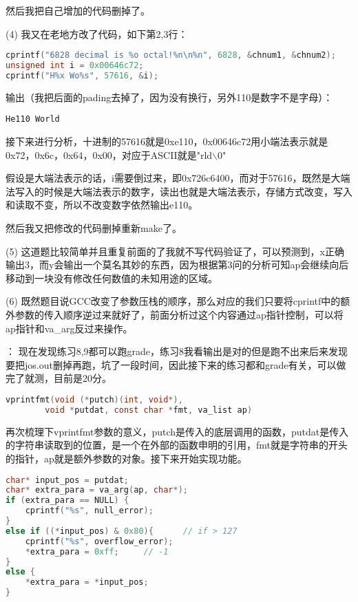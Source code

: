 \documentclass[a4paper, 11pt]{ctexart}
\begin{document}
然后我把自己增加的代码删掉了。

(4)
我又在老地方改了代码，如下第2,3行：
\begin{lstlisting}[language={C}]
cprintf("6828 decimal is %o octal!%n\n%n", 6828, &chnum1, &chnum2);
unsigned int i = 0x00646c72;
cprintf("H%x Wo%s", 57616, &i);
\end{lstlisting}

输出（我把后面的pading去掉了，因为没有换行，另外110是数字不是字母）：
\begin{lstlisting}[numbers=none]
He110 World
\end{lstlisting}

接下来进行分析，十进制的57616就是0xe110，0x00646c72用小端法表示就是0x72，0x6c，0x64，0x00，对应于ASCII就是"rld$\backslash$0"

假设是大端法表示的话，i需要倒过来，即0x726c6400，而对于57616，既然是大端法写入的时候是大端法表示的数字，读出也就是大端法表示，存储方式改变，写入和读取不变，所以不改变数字依然输出e110。

然后我又把修改的代码删掉重新make了。

(5)
这道题比较简单并且重复前面的了我就不写代码验证了，可以预测到，x正确输出3，而y会输出一个莫名其妙的东西，因为根据第3问的分析可知ap会继续向后移动到一块没有修改任何数值的未知用途的区域。

(6)
既然题目说GCC改变了参数压栈的顺序，那么对应的我们只要将cprintf中的额外参数的传入顺序逆过来就好了，前面分析过这个内容通过ap指针控制，可以将ap指针和va\_arg反过来操作。

\color{red}{练习9}：\color{black}
现在发现练习8,9都可以跑grade，练习8我看输出是对的但是跑不出来后来发现要把jos.out删掉再跑，坑了一段时间，因此接下来的练习都和grade有关，可以做完了就测，目前是20分。

\begin{lstlisting}[language={C},numbers=none]
vprintfmt(void (*putch)(int, void*),
		void *putdat, const char *fmt, va_list ap)
\end{lstlisting}

再次梳理下vprintfmt参数的意义，putch是传入的底层调用的函数，putdat是传入的字符串读取到的位置，是一个在外部的函数申明的引用，fmt就是字符串的开头的指针，ap就是额外参数的对象。接下来开始实现功能。

\begin{lstlisting}[language={C}]
char* input_pos = putdat;
char* extra_para = va_arg(ap, char*);
if (extra_para == NULL) {
	cprintf("%s", null_error);
}
else if ((*input_pos) & 0x80){		// if > 127
	cprintf("%s", overflow_error);
	*extra_para = 0xff;		// -1
}
else {
	*extra_para = *input_pos;
}
\end{lstlisting}
\end{document}
